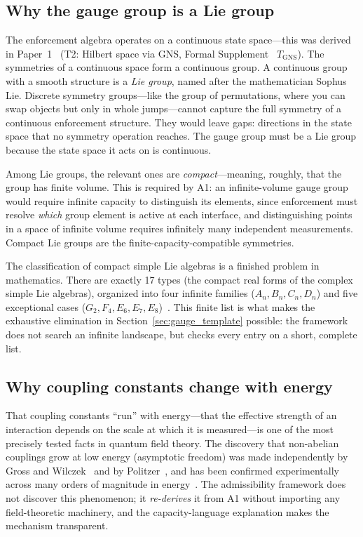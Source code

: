 \documentclass[11pt]{article}
\begin{document}
\subsection{Why the gauge group is a Lie group}

The enforcement algebra operates on a continuous state space---this was derived in Paper~1~\cite{BrookePaper1} (T2: Hilbert space via GNS, Formal Supplement~\cite{BrookeSupplement} $T_{\mathrm{GNS}}$).  The symmetries of a continuous space form a continuous group.  A continuous group with a smooth structure is a \emph{Lie group}, named after the mathematician Sophus Lie.  Discrete symmetry groups---like the group of permutations, where you can swap objects but only in whole jumps---cannot capture the full symmetry of a continuous enforcement structure.  They would leave gaps: directions in the state space that no symmetry operation reaches.  The gauge group must be a Lie group because the state space it acts on is continuous.

Among Lie groups, the relevant ones are \emph{compact}---meaning, roughly, that the group has finite volume.  This is required by A1: an infinite-volume gauge group would require infinite capacity to distinguish its elements, since enforcement must resolve \emph{which} group element is active at each interface, and distinguishing points in a space of infinite volume requires infinitely many independent measurements.  Compact Lie groups are the finite-capacity-compatible symmetries.

The classification of compact simple Lie algebras is a finished problem in mathematics.  There are exactly 17 types (the compact real forms of the complex simple Lie algebras), organized into four infinite families ($A_n, B_n, C_n, D_n$) and five exceptional cases ($G_2, F_4, E_6, E_7, E_8$)~\cite{Humphreys1972}.  This finite list is what makes the exhaustive elimination in Section~\ref{sec:gauge_template} possible: the framework does not search an infinite landscape, but checks every entry on a short, complete list.

\subsection{Why coupling constants change with energy}

That coupling constants ``run'' with energy---that the effective strength of an interaction depends on the scale at which it is measured---is one of the most precisely tested facts in quantum field theory.  The discovery that non-abelian couplings grow at low energy (asymptotic freedom) was made independently by Gross and Wilczek~\cite{GrossWilczek1973} and by Politzer~\cite{Politzer1973}, and has been confirmed experimentally across many orders of magnitude in energy~\cite{PDG2024}.  The admissibility framework does not discover this phenomenon; it \emph{re-derives} it from A1 without importing any field-theoretic machinery, and the capacity-language explanation makes the mechanism transparent.
\end{document}
